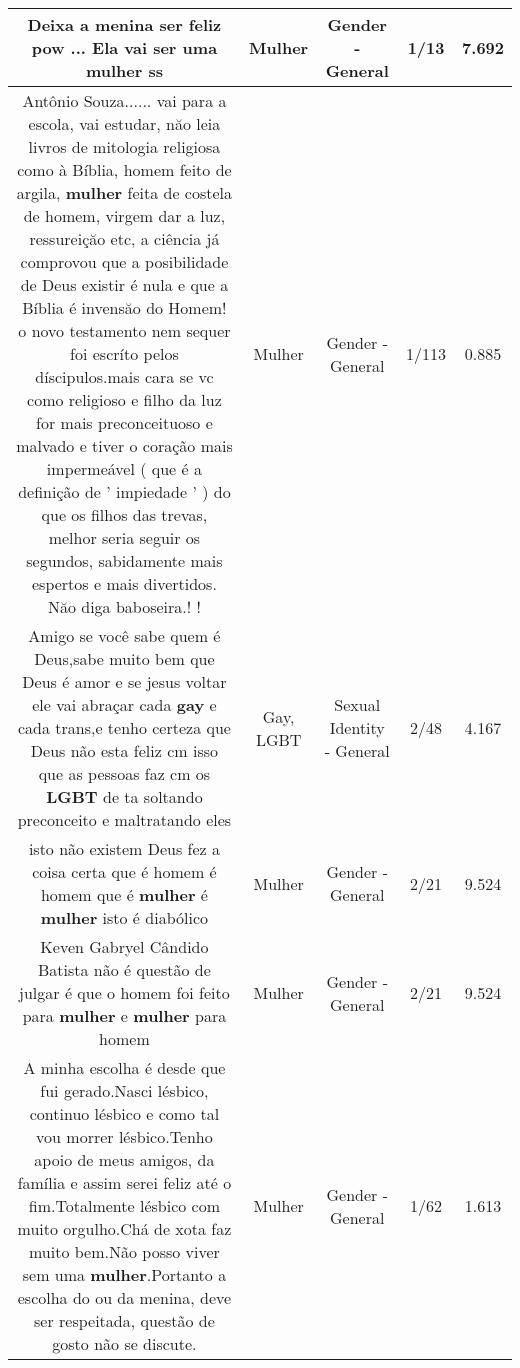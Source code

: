 \documentclass[11pt]{article}
\newlength\mylength
\begin{document}
\begin{center}
\begin{longtable}{|C{.65\mylength}|C{.30\mylength}|C{.12\mylength}|C{.12\mylength}|C{.12\mylength}|}
  \small Deixa a menina ser feliz pow ... Ela vai ser uma \textbf{mulher} ss\normalsize   & Mulher & Gender - General & 1/13 & 7.692 \\  \hline
  \small Antônio Souza...... vai para a escola, vai estudar, năo leia livros de mitologia religiosa como à Bíblia, homem feito de argila, \textbf{mulher} feita de costela de homem, virgem dar a luz, ressureiçăo etc, a ciência já comprovou que a posibilidade de Deus existir é nula e que a Bíblia é invensăo do Homem! o novo testamento nem sequer foi escríto pelos díscipulos.mais cara se vc como religioso e filho da luz for mais preconceituoso e malvado e tiver  o coração mais impermeável ( que é a definição de ' impiedade ' ) do que os filhos das trevas, melhor seria seguir os  segundos, sabidamente mais espertos e mais divertidos. Năo diga baboseira.! !\normalsize   & Mulher & Gender - General & 1/113 & 0.885 \\  \hline
  \small Amigo se você sabe quem é Deus,sabe muito bem que Deus é amor e se jesus voltar ele vai abraçar cada \textbf{gay} e cada trans,e tenho certeza que Deus não esta feliz cm isso que as pessoas faz cm os \textbf{LGBT} de ta soltando preconceito e maltratando eles\normalsize   & Gay, LGBT & Sexual Identity - General & 2/48 & 4.167 \\  \hline
  \small isto não existem Deus fez a coisa certa que é homem é homem que é \textbf{mulher} é \textbf{mulher} isto é diabólico\normalsize   & Mulher & Gender - General & 2/21 & 9.524 \\  \hline
  \small Keven Gabryel Cândido Batista não é questão de julgar é que o homem foi feito para \textbf{mulher} e \textbf{mulher} para homem\normalsize   & Mulher & Gender - General & 2/21 & 9.524 \\  \hline
  \small A minha escolha é desde que fui gerado.Nasci lésbico, continuo lésbico e como tal vou morrer lésbico.Tenho apoio de meus amigos, da família e assim serei feliz até o fim.Totalmente lésbico com muito orgulho.Chá de xota faz muito bem.Não posso viver sem uma \textbf{mulher}.Portanto a escolha do ou da menina, deve ser respeitada, questão de gosto não se discute.\normalsize   & Mulher & Gender - General & 1/62 & 1.613 \\  \hline

\end{longtable}
\end{center}
\end{document}
